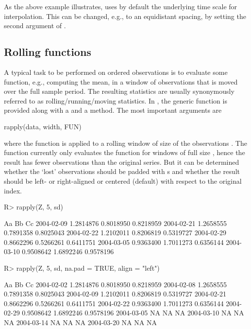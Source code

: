 \documentclass{Z}
\begin{document}
As the above example illustrates,  uses by default
the underlying time scale for interpolation. This can be changed, e.g.,
to an equidistant spacing, by setting the second argument of
.

\subsection{Rolling functions}
\label{sec:rolling}

A typical task to be performed on ordered observations is to evaluate some
function, e.g., computing the mean, in a window of observations that is moved
over the full sample period. The resulting statistics are usually synonymously referred to
as rolling/running/moving statistics. In , the generic function  
is provided along with a  and a  method. The most important arguments
are

\begin{Scode}
rapply(data, width, FUN)
\end{Scode}

where the function  is applied to a rolling window of size 
of the observations . The function  currently only evaluates
the function for windows of full size , hence the result has 
fewer observations than the original series. But it can be determined whether the `lost'
observations should be padded with s and whether the result should be left-
or right-aligned or centered (default) with respect to the original index.

\begin{Schunk}
\begin{Sinput}
R> rapply(Z, 5, sd)
\end{Sinput}
\begin{Soutput}
           Aa        Bb        Cc       
2004-02-09 1.2814876 0.8018950 0.8218959
2004-02-21 1.2658555 0.7891358 0.8025043
2004-02-22 1.2102011 0.8206819 0.5319727
2004-02-29 0.8662296 0.5266261 0.6411751
2004-03-05 0.9363400 1.7011273 0.6356144
2004-03-10 0.9508642 1.6892246 0.9578196
\end{Soutput}
\begin{Sinput}
R> rapply(Z, 5, sd, na.pad = TRUE, align = "left")
\end{Sinput}
\begin{Soutput}
           Aa        Bb        Cc       
2004-02-02 1.2814876 0.8018950 0.8218959
2004-02-08 1.2658555 0.7891358 0.8025043
2004-02-09 1.2102011 0.8206819 0.5319727
2004-02-21 0.8662296 0.5266261 0.6411751
2004-02-22 0.9363400 1.7011273 0.6356144
2004-02-29 0.9508642 1.6892246 0.9578196
2004-03-05        NA        NA        NA
2004-03-10        NA        NA        NA
2004-03-14        NA        NA        NA
2004-03-20        NA        NA        NA
\end{Soutput}
\end{Schunk}
\end{document}
